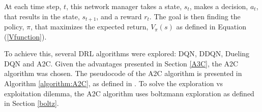 At each time step, $t$, this network manager takes a state, $s_t$, makes a decision, $a_t$, that results in the state, $s_{t+1}$, and a reward $r_t$. The goal is then finding the policy, $\pi$, that maximizes the expected return, $V_\pi(s)$ as defined in Equation (\ref{Vfunction}).

To achieve this, several \acrshort{DRL} algorithms were explored: \acrshort{DQN}, \acrshort{DDQN}, \acrshort{Dueling DQN} and \acrshort{A2C}. Given the advantages presented in Section \ref{A3C}, the \acrshort{A2C} algorithm was chosen. The pseudocode of the \acrshort{A2C} algorithm is presented in Algorithm \ref{algorithm:A2C}, as defined in \cite{a3c}. To solve the exploration vs exploitation dilemma, the \acrshort{A2C} algorithm uses boltzmann exploration as defined in Section \ref{boltz}.

\pagebreak

